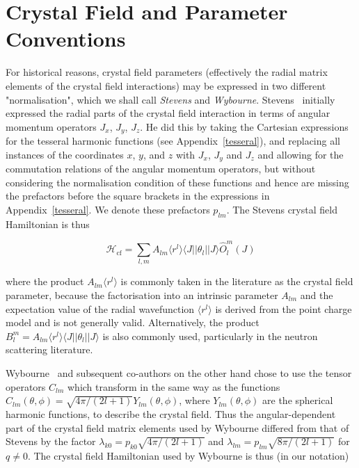 \section{Crystal Field and Parameter Conventions}\label{cfparconventions}

For historical reasons, crystal field parameters (effectively the radial matrix elements of the crystal field
interactions) may be expressed in two different "normalisation", which we shall call \emph{Stevens} and 
\emph{Wybourne}. Stevens~\cite{stevens52-209,hutchings64-227} initially expressed the radial parts of the crystal field interaction
in terms of angular momentum operators $J_x$, $J_y$, $J_z$. He did this by taking the Cartesian expressions for 
the tesseral harmonic functions (see Appendix~\ref{tesseral}), and replacing all instances of the coordinates
$x$, $y$, and $z$ with $J_x$, $J_y$ and $J_z$ and allowing for the commutation relations of the angular
momentum operators, but without considering the normalisation condition of these functions and hence are missing
the prefactors before the square brackets in the expressions in Appendix~\ref{tesseral}. We denote these
prefactors $p_{lm}$. The Stevens crystal field Hamiltonian is thus

\[
\mathcal{H}_{\mathrm{cf}} = \sum_{l,m} A_{lm} \langle r^l \rangle \langle J || \theta_l || J \rangle \hat{O}_l^m (J)
\]

\noindent where the product $A_{lm} \langle r^l \rangle$ is commonly taken in the literature as the crystal
field parameter, because the factorisation into an intrinsic parameter $A_{lm}$ and the expectation value of
the radial wavefunction $\langle r^l \rangle$ is derived from the point charge model and is not generally
valid. Alternatively, the product $B_l^m = A_{lm} \langle r^l \rangle \langle J || \theta_l || J \rangle$ is
also commonly used, particularly in the neutron scattering literature.

Wybourne~\cite{wybourne65} and subsequent co-authors on the other hand chose to use the tensor operators 
$\hat{C}_{lm}$ which transform in the same way as the functions $C_{lm}(\theta,\phi) = \sqrt{4\pi / (2l+1)}
Y_{lm}(\theta,\phi)$, where $Y_{lm}(\theta,\phi)$ are the spherical harmonic functions, to describe the crystal
field. Thus the angular-dependent part of the crystal field matrix elements used by Wybourne differed from
that of Stevens by the factor $\lambda_{k0} = p_{k0} \sqrt{4\pi / (2l+1)}$ and
 $\lambda_{lm} = p_{lm} \sqrt{8\pi / (2l+1)}$ for $q\neq 0$. The crystal field Hamiltonian used by Wybourne is
thus (in our notation)

